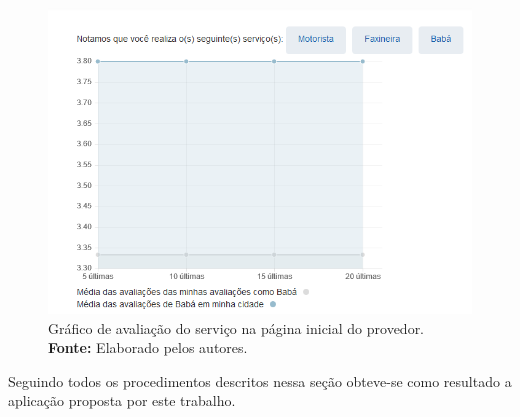 \newpage
\begin{figure}[h!]
	\centerline{\includegraphics[scale=0.65]{./imagens/grafico-pagina-inicial.png}}
	\caption[Gráfico de avaliação do serviço na página inicial do provedor.]
	{Gráfico de avaliação do serviço na página inicial do provedor. \textbf{Fonte:} Elaborado pelos autores.}
	\label{fig:grafico_pagina_inicial}
\end{figure}

\par Seguindo todos os procedimentos descritos nessa seção obteve-se como resultado a aplicação proposta por este trabalho.